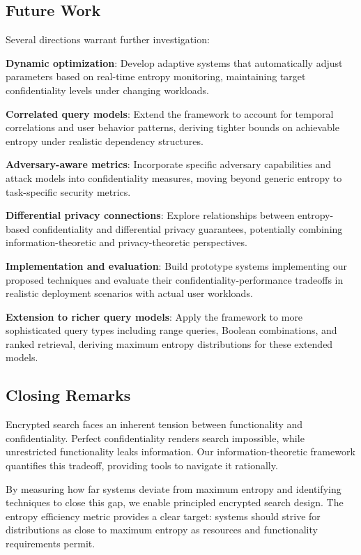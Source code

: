 \documentclass[final,11pt]{article}
\numberwithin{equation}{section}
\theoremstyle{plain}
\theoremstyle{remark}
\begin{document}
\subsection{Future Work}
Several directions warrant further investigation:

\textbf{Dynamic optimization}: Develop adaptive systems that automatically adjust parameters based on real-time entropy monitoring, maintaining target confidentiality levels under changing workloads.

\textbf{Correlated query models}: Extend the framework to account for temporal correlations and user behavior patterns, deriving tighter bounds on achievable entropy under realistic dependency structures.

\textbf{Adversary-aware metrics}: Incorporate specific adversary capabilities and attack models into confidentiality measures, moving beyond generic entropy to task-specific security metrics.

\textbf{Differential privacy connections}: Explore relationships between entropy-based confidentiality and differential privacy guarantees, potentially combining information-theoretic and privacy-theoretic perspectives.

\textbf{Implementation and evaluation}: Build prototype systems implementing our proposed techniques and evaluate their confidentiality-performance tradeoffs in realistic deployment scenarios with actual user workloads.

\textbf{Extension to richer query models}: Apply the framework to more sophisticated query types including range queries, Boolean combinations, and ranked retrieval, deriving maximum entropy distributions for these extended models.

\subsection{Closing Remarks}
Encrypted search faces an inherent tension between functionality and confidentiality. Perfect confidentiality renders search impossible, while unrestricted functionality leaks information. Our information-theoretic framework quantifies this tradeoff, providing tools to navigate it rationally.

By measuring how far systems deviate from maximum entropy and identifying techniques to close this gap, we enable principled encrypted search design. The entropy efficiency metric provides a clear target: systems should strive for distributions as close to maximum entropy as resources and functionality requirements permit.
\end{document}
